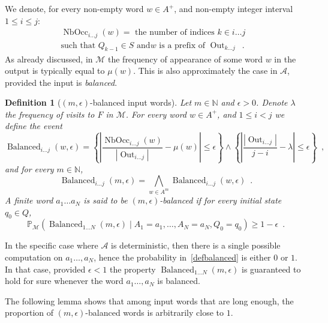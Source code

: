 \documentclass[11pt]{article}
\newtheorem{definition}{Definition}
\newcommand{\A}{\mathcal{A}}
\newcommand{\M}{\mathcal{M}}
\newcommand{\NN}{\mathbb{N}}
\newcommand{\PP}{\mathbb{P}}
\DeclareMathOperator{\nbocc}{NbOcc}
\DeclareMathOperator{\outp}{Out}
\DeclareMathOperator{\good}{Balanced}
\begin{document}
We denote,
for every non-empty word $w\in A^+$,
and non-empty integer interval $1  \leq i \leq j$:
\begin{multline*}
\nbocc_{i\ldots j}(w) =  \text{ the number of indices $k\in i\ldots j$ }\\
\text{such that 
$Q_{k-1}\in S$ and
$w$ is a prefix of $\outp_{k\ldots j}$}\enspace.
\end{multline*}
As already discussed,
in $\M$ the frequency of appearance of some word $w$ in the output is typically
equal to $\mu(w)$. This is also approximately the case
 in $\A$, provided the input is \emph{balanced}.
 
\begin{definition}[$(m,\epsilon)$-balanced input words]
\label{def:balancedness}
Let $m\in \NN$ and $\epsilon >0$.
Denote $\lambda$ the frequency of visits to $F$ in $\M$.
For every word $w\in A^+$, and $1 \leq i < j$
we define the event 
\[
\good_{i\ldots j}(w,\epsilon)=
\left\{
\left | \frac{\nbocc_{i\ldots j}(w)}{|\outp_{i\ldots j}|} -  \mu(w)\right | \leq \epsilon
\right\}
\land
\left\{
\left |\frac{|\outp_{i\ldots j}|}{j -i} - \lambda \right|
\leq  \epsilon 
\right\}
\enspace,
\]
and for every $m\in\NN$,
\[
\good_{i\ldots j}(m,\epsilon)=
\bigwedge_{w \in A^m}\good_{i\ldots j}(w,\epsilon) \enspace.
\]
 A finite word $a_1 \ldots a_N$ is said to be $(m,\epsilon)$-balanced if
 for every initial state $q_0\in Q$, 
 \begin{equation}\label{defbalanced}
 \PP_{\M}\left(  \good_{1\ldots N}(m,\epsilon)  \mid A_1=a_1,\ldots ,A_N=a_N, Q_0 = q_0\right) \geq 1 - \epsilon\enspace.
 \end{equation}
\end{definition}

In the specific case where $\A$ is deterministic,
then there is a single possible computation on $a_1\ldots , a_N$,
hence the probability in~\eqref{defbalanced} is either $0$
or $1$. In that case, provided $\epsilon <1$ the 
property $\good_{1\ldots N}(m,\epsilon)$
is guaranteed to hold for sure
whenever the word $a_1\ldots , a_N$ is 
balanced.

The following lemma shows that among input words that are long enough,
the proportion of $(m,\epsilon)$-balanced words is arbitrarily close to $1$.
\end{document}
